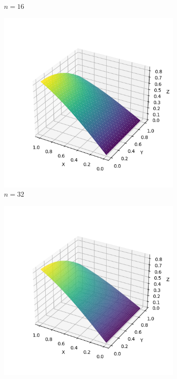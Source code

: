 \documentclass[lang=cn,a4paper,newtx,bibend=bibtex]{elegantpaper}
\begin{document}
\begin{figure}[H]
\begin{subfigure}[b]{0.18\textwidth}
      \caption{$n= 16$}
  \end{subfigure}
  \hfill
  \begin{subfigure}[b]{0.18\textwidth}
      \includegraphics[width=\textwidth]{../../res_bac/res-[data|2-mixed-regular-c32].png}
      \caption{$n = 32$}
  \end{subfigure}
  \hfill
  \begin{subfigure}[b]{0.18\textwidth}
      \includegraphics[width=\textwidth]{../../res_bac/res-[data|2-mixed-regular-d64].png}

\end{subfigure}
\end{figure}
\end{document}
